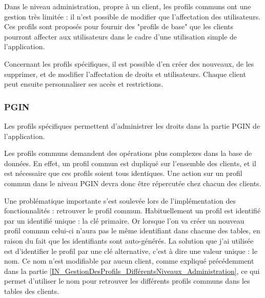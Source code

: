 Dans le niveau administration, propre à un client, les profils communs ont une gestion très limitée : il n'est possible de modifier que l'affectation des utilisateurs.
Ces profils sont proposés pour fournir des "profils de base" que les clients pourront affecter aux utilisateurs dans le cadre d'une utilisation simple de l'application.

Concernant les profils spécifiques, il est possible d'en créer des nouveaux, de les supprimer, et de modifier l'affectation de droits et utilisateurs.
Chaque client peut ensuite personnaliser ses accès et restrictions.


\subsubsection{PGIN}

Les profils spécifiques permettent d'administrer les droits dans la partie PGIN de l'application.

Les profils communs demandent des opérations plus complexes dans la base de données.
En effet, un profil commun est dupliqué sur l'ensemble des clients, et il est nécessaire que ces profils soient tous identiques.
Une action sur un profil commun dans le niveau PGIN devra donc être répercutée chez chacun des clients.

Une problématique importante s'est soulevée lors de l'implémentation des fonctionnalités : retrouver le profil commun.
Habituellement un profil est identifié par un identifié unique : la clé primaire.
Or lorsque l'on va créer un nouveau profil commun celui-ci n'aura pas le même identifiant dans chacune des tables, en raison du fait que les identifiants sont auto-générés.
La solution que j'ai utilisée est d'identifier le profil par une clé alternative, c'est à dire une valeur unique : le nom.
Ce nom n'est modifiable par aucun client, comme expliqué précédemment dans la partie \ref{IN_GestionDesProfils_DifférentsNiveaux_Administration}, ce qui permet d'utiliser le nom pour retrouver les différents profils communs dans les tables des clients.


